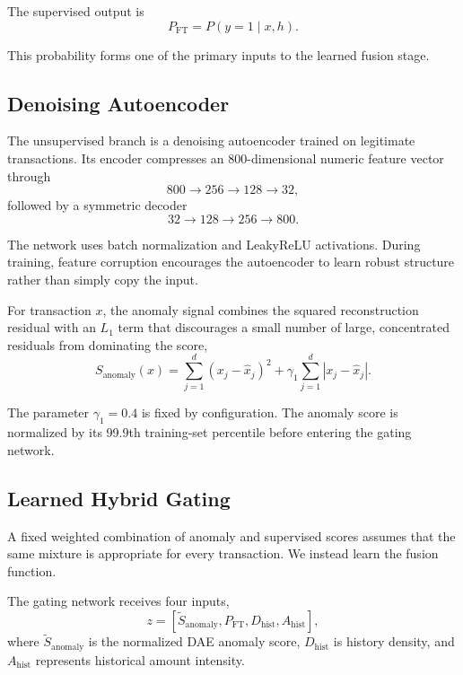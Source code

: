 \documentclass[conference]{IEEEtran}
\begin{document}
The supervised output is
\begin{equation}
P_{\mathrm{FT}} = P(y=1 \mid x,h).
\end{equation}

This probability forms one of the primary inputs to the learned fusion stage.

\subsection{Denoising Autoencoder}

The unsupervised branch is a denoising autoencoder trained on legitimate
transactions. Its encoder compresses an 800-dimensional numeric feature vector
through
\begin{equation}
800 \rightarrow 256 \rightarrow 128 \rightarrow 32,
\end{equation}
followed by a symmetric decoder
\begin{equation}
32 \rightarrow 128 \rightarrow 256 \rightarrow 800.
\end{equation}

The network uses batch normalization and LeakyReLU activations. During training,
feature corruption encourages the autoencoder to learn robust structure rather
than simply copy the input.

For transaction $x$, the anomaly signal combines the squared reconstruction
residual with an $L_1$ term that discourages a small number of large,
concentrated residuals from dominating the score,
\begin{equation}
S_{\mathrm{anomaly}}(x)
=
\sum_{j=1}^{d}
\left(x_j-\hat{x}_j\right)^2
+
\gamma_1
\sum_{j=1}^{d}
\left|x_j-\hat{x}_j\right|.
\end{equation}

The parameter $\gamma_1=0.4$ is fixed by configuration. The anomaly score is
normalized by its 99.9th training-set percentile before entering the gating
network.

\subsection{Learned Hybrid Gating}

A fixed weighted combination of anomaly and supervised scores assumes that the
same mixture is appropriate for every transaction. We instead learn the fusion
function.

The gating network receives four inputs,
\begin{equation}
z =
\left[
\tilde{S}_{\mathrm{anomaly}},
P_{\mathrm{FT}},
D_{\mathrm{hist}},
A_{\mathrm{hist}}
\right],
\end{equation}
where $\tilde{S}_{\mathrm{anomaly}}$ is the normalized DAE anomaly score,
$D_{\mathrm{hist}}$ is history density, and $A_{\mathrm{hist}}$ represents
historical amount intensity.
\end{document}
